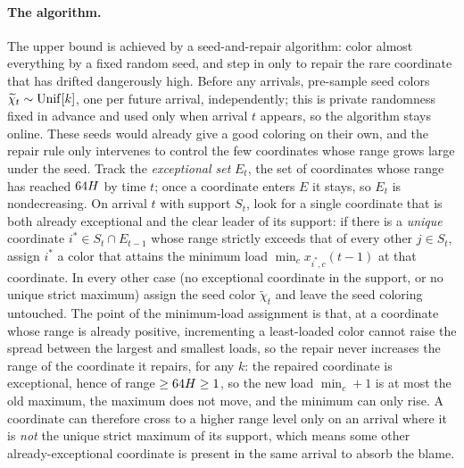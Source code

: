 \paragraph{The algorithm.}
The upper bound is achieved by a seed-and-repair algorithm: color almost everything by a fixed random seed, and step in only
to repair the rare coordinate that has drifted dangerously high. Before any arrivals, pre-sample seed colors
$\widetilde\chi_t\sim\mathrm{Unif}[k]$, one per future arrival, independently; this is private randomness fixed in advance and used
only when arrival $t$ appears, so the algorithm stays online. These seeds would already give a good coloring on their own,
and the repair rule only intervenes to control the few coordinates whose range grows large under the seed. Track the
\emph{exceptional set} $E_t$, the set of coordinates whose range has reached $64H$ by time $t$; once a coordinate
enters $E$ it stays, so $E_t$ is nondecreasing. On arrival $t$ with support $S_t$, look for a single coordinate that is both
already exceptional and the clear leader of its support: if there is a \emph{unique} coordinate $i^*\in S_t\cap E_{t-1}$
whose range strictly exceeds that of every other $j\in S_t$, assign $i^*$ a color that attains the minimum load
$\min_c x_{i^*,c}(t-1)$ at that coordinate. In every other case (no exceptional coordinate in the support, or no unique
strict maximum) assign the seed color $\widetilde\chi_t$ and leave the seed coloring untouched. The point of the
minimum-load assignment is that, at a coordinate whose range is already positive, incrementing a least-loaded color cannot
raise the spread between the largest and smallest loads, so the repair never increases the range of the coordinate it
repairs, for any $k$: the repaired coordinate is exceptional, hence of range $\ge 64H\ge1$, so the new load
$\min_c+1$ is at most the old maximum, the maximum does not move, and the minimum can only rise. A coordinate can therefore cross to a higher range
level only on an arrival where it is \emph{not} the unique strict maximum of its support, which means some other
already-exceptional coordinate is present in the same arrival to absorb the blame.

